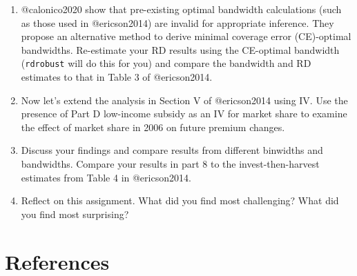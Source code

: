 \documentclass[
  12pt,
]{article}
\begin{document}
\begin{enumerate}
\def\labelenumi{\arabic{enumi}.}
\setcounter{enumi}{6}
\item
  @calonico2020 show that pre-existing optimal bandwidth calculations
  (such as those used in @ericson2014) are invalid for appropriate
  inference. They propose an alternative method to derive minimal
  coverage error (CE)-optimal bandwidths. Re-estimate your RD results
  using the CE-optimal bandwidth (\texttt{rdrobust} will do this for
  you) and compare the bandwidth and RD estimates to that in Table 3 of
  @ericson2014.
\item
  Now let's extend the analysis in Section V of @ericson2014 using IV.
  Use the presence of Part D low-income subsidy as an IV for market
  share to examine the effect of market share in 2006 on future premium
  changes.
\item
  Discuss your findings and compare results from different binwidths and
  bandwidths. Compare your results in part 8 to the invest-then-harvest
  estimates from Table 4 in @ericson2014.
\item
  Reflect on this assignment. What did you find most challenging? What
  did you find most surprising?
\end{enumerate}

\hypertarget{references}{%
\section{References}\label{references}}
\end{document}
